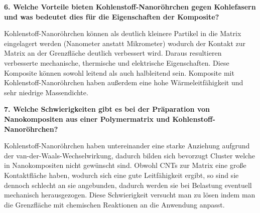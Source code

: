 \noindent\textbf{6. Welche Vorteile bieten Kohlenstoff-Nanoröhrchen gegen Kohlefasern und was bedeutet dies für die Eigenschaften der Komposite?}\\
\begin{addmargin}[25pt]{0pt}
Kohlenstoff-Nanoröhrchen können als deutlich kleinere Partikel in die Matrix eingelagert werden (Nanometer anstatt Mikrometer) wodurch der Kontakt zur Matrix an der Grenzfläche deutlich verbessert wird. Daraus resultieren verbesserte mechanische, thermische und elektrische Eigenschaften. Diese Komposite können sowohl leitend als auch halbleitend sein. Komposite mit Kohlenstoff-Nanoröhrchen haben außerdem eine hohe Wärmeleitfähigkeit und sehr niedrige Massendichte.  \\
\end{addmargin}

\noindent\textbf{7. Welche Schwierigkeiten gibt es bei der Präparation von Nanokompositen aus einer Polymermatrix und Kohlenstoff-Nanoröhrchen?}\\
\begin{addmargin}[25pt]{0pt}
Kohlenstoff-Nanoröhrchen haben untereinander eine starke Anziehung aufgrund der van-der-Waals-Wechselwirkung, dadurch bilden sich bevorzugt Cluster welche in Nanokompositen nicht gewünscht sind. Obwohl CNTs zur Matrix eine große Kontaktfläche haben, wodurch sich eine gute Leitfähigkeit ergibt, so sind sie dennoch schlecht an sie angebunden, dadurch werden sie bei Belastung eventuell mechanisch herausgezogen. Diese Schwierigkeit versucht man zu lösen indem man die Grenzfläche mit chemischen Reaktionen an die Anwendung anpasst.  \\
\end{addmargin}

